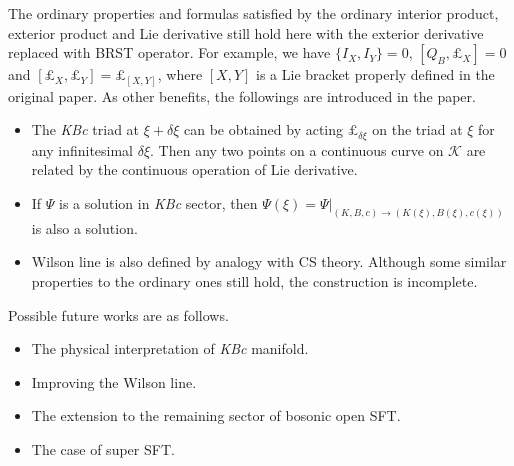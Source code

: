 \documentclass[12pt]{article}
\begin{document}
The ordinary properties and formulas satisfied by the ordinary interior product, exterior product and Lie derivative 
still hold here with the exterior derivative replaced with BRST operator.
For example, we have $\{I_X,I_Y\} = 0$, $[Q_B,\pounds_X] = 0$ and $[\pounds_X,\pounds_Y] = \pounds_{[X,Y]}$, 
where $[X,Y]$ is a Lie bracket properly defined in the original paper.
As other benefits, the followings are introduced in the paper.
\begin{itemize}
	\item The \textit{KBc} triad at $\xi + \delta \xi$ can be obtained by acting $\pounds_{\delta \xi}$ on the triad at $\xi$ 
		for any infinitesimal $\delta\xi$. Then any two points on a continuous curve on $\mathcal K$ are related by 
		the continuous operation of Lie derivative.
	\item If $\Psi$ is a solution in \textit{KBc} sector, 
		then $\Psi(\xi)=\Psi|_{(K,B,c)\to (K(\xi),B(\xi),c(\xi))}$ is also a solution.
	\item Wilson line is also defined by analogy with CS theory. Although some similar properties to the ordinary ones still hold,
		 the construction is incomplete.
\end{itemize}
Possible future works are as follows.
\begin{itemize}
	\item The physical interpretation of \textit{KBc} manifold.
	\item Improving the Wilson line.
	\item The extension to the remaining sector of bosonic open SFT.
	\item The case of super SFT.
\end{itemize}
\end{document}
